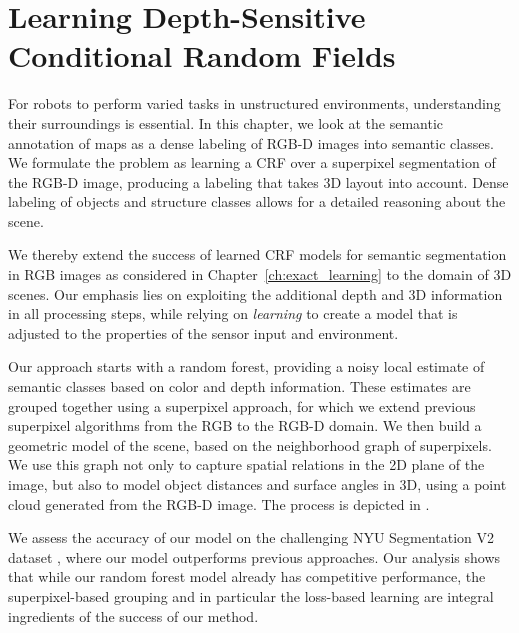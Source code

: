
\chapter{Learning Depth-Sensitive Conditional Random Fields}\label{ch:nyu}

For robots to perform varied tasks in unstructured environments, understanding their
surroundings is essential. In this chapter, we look at the semantic annotation of maps
as a dense labeling of \mbox{RGB-D} images into semantic classes. We formulate the problem
as learning a CRF over a superpixel segmentation of the \mbox{RGB-D} image, producing a labeling
that takes 3D layout into account. Dense labeling of objects
and structure classes allows for a detailed reasoning about the scene.


We thereby extend the success of learned CRF models for semantic segmentation
in RGB images as considered in Chapter~\ref{ch:exact_learning} to the domain of 3D scenes.
Our emphasis lies on exploiting the additional depth and 3D information in all
processing steps, while relying on \emph{learning} to create a model that 
is adjusted to the properties of the sensor input and environment.

Our approach starts with a random forest, providing a noisy local estimate
of semantic classes based on color and depth information. These estimates
are grouped together using a superpixel approach, for which we extend previous
superpixel algorithms from the RGB to the \mbox{RGB-D} domain.
We then build a geometric model of the scene, based on the neighborhood graph
of superpixels.  We use this graph not only to capture spatial relations in the
2D plane of the image, but also to model object distances and surface angles in
3D, using a point cloud generated from the \mbox{RGB-D} image. The process is depicted
in .

We assess the accuracy of our model on the challenging NYU Segmentation V2
dataset \citep{SilbermanECCV12}, where our model outperforms previous
approaches.  Our analysis shows that while our random forest model
already has competitive performance, the superpixel-based grouping and in
particular the loss-based learning are integral ingredients of the success of our method.

